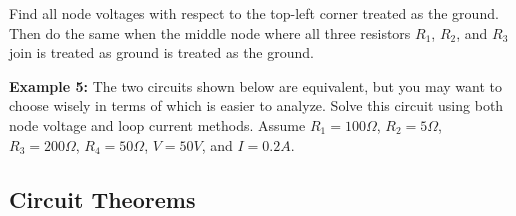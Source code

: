 \documentclass{article}
\begin{document}

Find all node voltages with respect to the top-left corner treated 
as the ground. Then do the same when the middle node where all three 
resistors $R_1$, $R_2$, and $R_3$ join is treated as ground is treated 
as the ground.




{\bf Example 5:} The two circuits shown below are equivalent, but you 
may want to choose wisely in terms of which is easier to analyze. Solve 
this circuit using both node voltage and loop current methods. Assume 
$R_1=100\Omega$, $R_2=5\Omega$, $R_3=200\Omega$, $R_4=50\Omega$, $V=50V$,
and $I=0.2A$.

  


\subsection*{Circuit Theorems}
\end{document}
